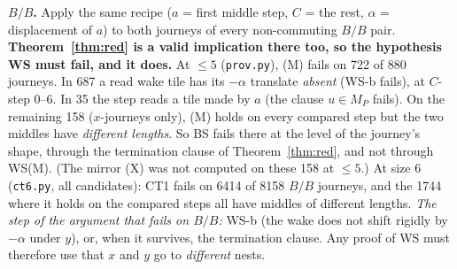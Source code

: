 \documentclass[11pt]{article}
\theoremstyle{definition}\newtheorem{definition}[theorem]{Definition}\newtheorem{remark}[theorem]{Remark}
\begin{document}
\textbf{$B/B$.} Apply the same recipe ($a$ = first middle step, $C$ = the rest, $\alpha$ = displacement of $a$) to both journeys of every non-commuting $B/B$ pair. \textbf{Theorem~\ref{thm:red} is a valid implication there too, so the hypothesis WS must fail, and it does.}
At $\le5$ (\texttt{prov.py}), (M) fails on 722 of 880 journeys. In 687 a read wake tile has its $-\alpha$ translate \emph{absent} (WS-b fails), at $C$-step 0--6. In 35 the step reads a tile made by $a$ (the clause $u\in M_P$ fails).
On the remaining 158 ($x$-journeys only), (M) holds on every compared step but the two middles have \emph{different lengths}. So BS fails there at the level of the journey's shape, through the termination clause of Theorem~\ref{thm:red}, and not through WS(M). (The mirror (X) was not computed on these 158 at $\le5$.)
At size 6 (\texttt{ct6.py}, all candidates): CT1 fails on 6414 of 8158 $B/B$ journeys, and the 1744 where it holds on the compared steps all have middles of different lengths.
\emph{The step of the argument that fails on $B/B$:} WS-b (the wake does not shift rigidly by $-\alpha$ under $y$), or, when it survives, the termination clause. Any proof of WS must therefore use that $x$ and $y$ go to \emph{different} nests.
\end{document}
